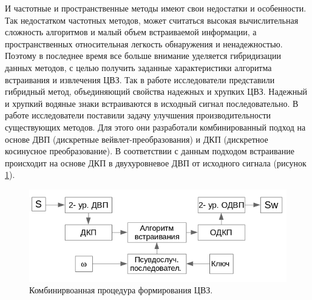    \par И частотные и пространственные методы имеют свои недостатки и особенности. Так недостатком частотных методов, может считаться высокая вычислительная сложность алгоритмов и малый объем встраиваемой информации, а пространственных относительная легкость обнаружения и ненадежностью. Поэтому в последнее время все больше внимание уделяется гибридизации данных методов, с целью получить заданные характеристики алгоритма встраивания и извлечения ЦВЗ. Так в работе \cite{deguillaume2003} исследователи представили гибридный метод, объединяющий свойства надежных и хрупких ЦВЗ. Надежный и хрупкий водяные знаки встраиваются в исходный сигнал последовательно. В работе \cite{al2007} исследователи поставили задачу улучшения производительности существующих методов. Для этого они разработали комбинированный подход на основе ДВП (дискретные вейвлет-преобразования) и ДКП (дискретное косинусное преобразование). В соответствии с данным подходом встраивание происходит на основе ДКП в двухуровневое ДВП от исходного сигнала (рисунок \ref{fig:HybridWM}).
   \begin{figure}[h]
\centering
\includegraphics[width=0.7\linewidth]{./HybridWM}
\caption{Комбинирвоанная процедура формирования ЦВЗ.}
\label{fig:HybridWM}
\end{figure}

   



